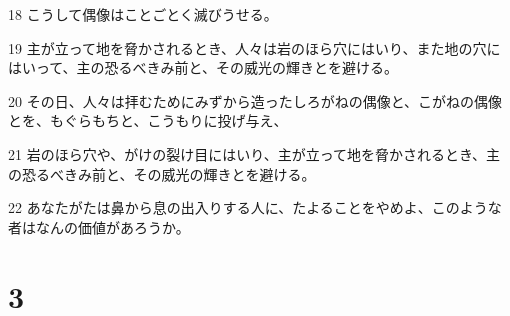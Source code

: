 \par 18 こうして偶像はことごとく滅びうせる。
\par 19 主が立って地を脅かされるとき、人々は岩のほら穴にはいり、また地の穴にはいって、主の恐るべきみ前と、その威光の輝きとを避ける。
\par 20 その日、人々は拝むためにみずから造ったしろがねの偶像と、こがねの偶像とを、もぐらもちと、こうもりに投げ与え、
\par 21 岩のほら穴や、がけの裂け目にはいり、主が立って地を脅かされるとき、主の恐るべきみ前と、その威光の輝きとを避ける。
\par 22 あなたがたは鼻から息の出入りする人に、たよることをやめよ、このような者はなんの価値があろうか。

\chapter{3}

